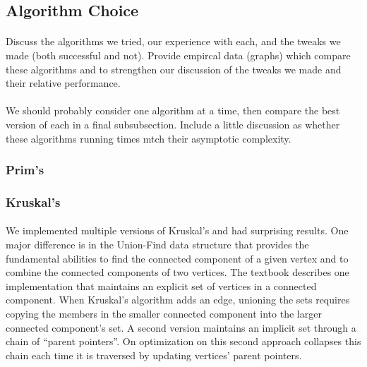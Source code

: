 \subsection{Algorithm Choice}
\label{sec:deep:algchoice}
\paragraph{}
Discuss the algorithms we tried, our experience with each, and the tweaks we
made (both successful and not).  Provide empircal data (graphs) which compare
these algorithms and to strengthen our discussion of the tweaks we made and
their relative performance.

\paragraph{}
We should probably consider one algorithm at a time, then compare the best
version of each in a final subsubsection.  Include a little discussion as
whether these algorithms running times mtch their asymptotic complexity.

\subsubsection{Prim's}
\paragraph{}

\subsubsection{Kruskal's}
\paragraph{}
We implemented multiple versions of Kruskal's and had surprising
results. One major difference is in the Union-Find data structure that
provides the fundamental abilities to find the connected component of a
given vertex and to combine the connected components of two vertices. The
textbook describes one implementation that maintains an explicit set of
vertices in a connected component. When Kruskal's algorithm adds an edge,
unioning the sets requires copying the members in the smaller connected
component into the larger connected component's set. A second version
maintains an implicit set through a chain of ``parent
pointers''. On optimization on this second approach collapses this chain
each time it is traversed by updating vertices' parent pointers.


